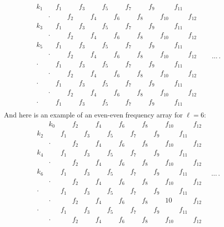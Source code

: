 \documentclass[pdftex]{sigma}
\numberwithin{equation}{section}
\theoremstyle{definition}
\begin{document}
\begin{equation*}
\begin{matrix}
k_1 && f_1 && f_3 && f_5 && f_7 && f_9 && f_{11} & \\
& \cdot && f_2 && f_4 && f_6 && f_8 && f_{10} && f_{12}\\
k_3 && f_1 && f_3 && f_5 && f_7 && f_9 && f_{11} & \\
& \cdot && f_2 && f_4 && f_6 && f_8 && f_{10} && f_{12}\\
k_5 && f_1 && f_3 && f_5 && f_7 && f_9 && f_{11} & \\
& \cdot && f_2 && f_4 && f_6 && f_8 && f_{10} && f_{12}\\
\cdot && f_1 && f_3 && f_5 && f_7 && f_9 && f_{11} & & \\
& \cdot && f_2 && f_4 && f_6 && f_8 && f_{10} && f_{12}\\
\cdot && f_1 && f_3 && f_5 && f_7 && f_9 && f_{11} & \\
& \cdot && f_2 && f_4 && f_6 && f_8 && f_{10} && f_{12}\\
\cdot && f_1 && f_3 && f_5 && f_7 && f_9 && f_{11} & \\
\end{matrix}\quad\dots \,.
\end{equation*}
And here is an example of an even-even frequency array for $\ell=6$:
\begin{equation*}
\begin{matrix}
& k_0 && f_2 && f_4 && f_6 && f_8 && f_{10} && f_{12}\\
k_2 && f_1 && f_3 && f_5 && f_7 && f_9 && f_{11} & \\
& \cdot && f_2 && f_4 && f_6 && f_8 && f_{10} && f_{12}\\
k_4 && f_1 && f_3 && f_5 && f_7 && f_9 && f_{11} & \\
& \cdot && f_2 && f_4 && f_6 && f_8 && f_{10} && f_{12}\\
k_6 && f_1 && f_3 && f_5 && f_7 && f_9 && f_{11} & \\
& \cdot && f_2 && f_4 && f_6 && f_8 && f_{10} && f_{12}\\
\cdot && f_1 && f_3 && f_5 && f_7 && f_9 && f_{11} & \\
& \cdot && f_2 && f_4 && f_6 && f_8 && 10 && f_{12}\\
\cdot && f_1 && f_3 && f_5 && f_7 && f_9 && f_{11} & \\
& \cdot && f_2 && f_4 && f_6 && f_8 && f_{10} && f_{12}\\
\end{matrix}\quad\dots \,.
\end{equation*}
\end{document}
